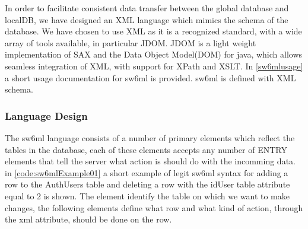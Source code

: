 In order to facilitate consistent data transfer between the global database and localDB, we have designed an XML language which mimics
the schema of the database. We have chosen to use XML as it is a recognized standard, with a wide array of tools available, in particular JDOM\cite{www.jdom.org}.
JDOM is a light weight implementation of SAX and the Data Object Model(DOM) for java, which allows seamless integration of XML, with support for XPath and XSLT.
In \autoref{sw6mlusage} a short usage documentation for sw6ml is provided. sw6ml is defined with XML schema.

\subsubsection{Language Design}

The sw6ml language consists of a number of primary elements which reflect the tables in the database, each of these elements accepts any number of ENTRY elements that tell
the server what action is should do with the incomming data.
in \autoref{code:sw6mlExample01} a short example of legit sw6ml syntax for adding a row to the AuthUsers table and deleting a row with the idUser table attribute equal to 2 is shown.
The  element identify the table on which we want to make changes, the following  elements
define what row and what kind of action, through the  xml attribute, should be done on the row. 

